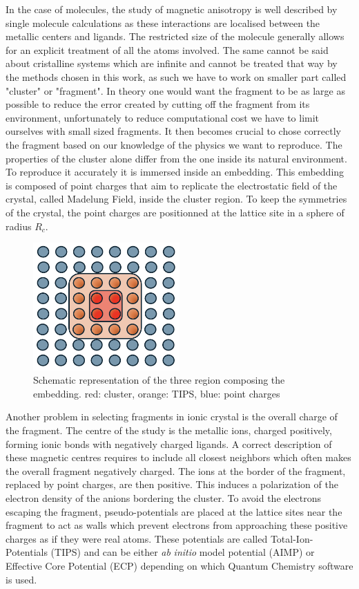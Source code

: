 \documentclass[10pt]{report}
\numberwithin{equation}{section}
\begin{document}
In the case of molecules, the study of magnetic anisotropy is well described by single molecule calculations as these interactions are localised between the metallic centers and ligands. 
The restricted size of the molecule generally allows for an explicit treatment of all the atoms involved.
The same cannot be said about cristalline systems which are infinite and cannot be treated that way by the methods chosen in this work, as such we have to work on smaller part called "cluster" or "fragment".
In theory one would want the fragment to be as large as possible to reduce the error created by cutting off the fragment from its environment, unfortunately to reduce computational cost we have to limit ourselves with small sized fragments. 
It then becomes crucial to chose correctly the fragment based on our knowledge of the physics we want to reproduce.
The properties of the cluster alone differ from the one inside its natural environment. To reproduce it accurately it is immersed inside an embedding. 
This embedding is composed of point charges that aim to replicate the electrostatic field of the crystal, called Madelung Field, inside the cluster region. 
To keep the symmetries of the crystal, the point charges are positionned at the lattice site in a sphere of radius $R_c$. 
\begin{figure}[!ht]
    \centering
    \includegraphics[width=0.5\textwidth]{Images/Bain.png}
    \caption{Schematic representation of the three region composing the embedding. red: cluster, orange: TIPS, blue: point charges}
    \label{Bain}
\end{figure}
Another problem in selecting fragments in ionic crystal is the overall charge of the fragment.
The centre of the study is the metallic ions, charged positively, forming ionic bonds with negatively charged ligands.
A correct description of these magnetic centres requires to include all closest neighbors which often makes the overall fragment negatively charged.
The ions at the border of the fragment, replaced by point charges, are then positive. This induces a polarization of the electron density of the anions bordering the cluster.
To avoid the electrons escaping the fragment, pseudo-potentials are placed at the lattice sites near the fragment to act as walls which prevent electrons from approaching these positive charges as if they were real atoms.
These potentials are called Total-Ion-Potentials (TIPS) and can be either \textit{ab} \textit{initio} model potential (AIMP) or Effective Core Potential (ECP) depending on which Quantum Chemistry software is used.
\end{document}
